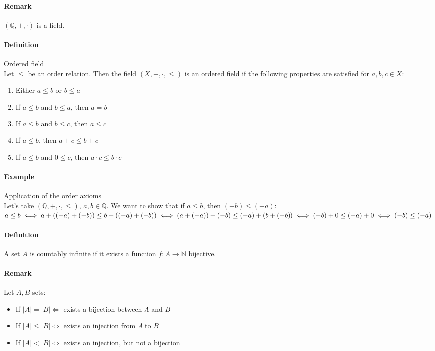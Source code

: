 \documentclass{article}
\newcommand{\functoN}[2]{#1 : #2 \rightarrow \mathbb{N}}
\newcommand{\Q}{\mathbb{Q}}
\newcommand{\Def}{\paragraph{Definition}}
\newcommand{\Remark}{\paragraph{Remark}}
\newcommand{\Example}{\paragraph{Example}}
\begin{document}
	\Remark $(\Q, +, \cdot)$ is a field.

	\Def Ordered field
\\Let $\leq$ be an order relation. Then the field $(X, +, \cdot, \leq)$ is an
	ordered field if the following properties are satisfied for $a, b, c\in X$:
	\begin{enumerate}[label=(\roman*)]
		\item Either $a \leq b$ or $b \leq a$

		\item If $a \leq b$ and $b \leq a$, then $a = b$

		\item If $a \leq b$ and $b \leq c$, then $a \leq c$

		\item If $a \leq b$, then $a + c \leq b + c$

		\item If $a \leq b$ and $0 \leq c$, then $a \cdot c \leq b \cdot c$
	\end{enumerate}

	\Example Application of the order axioms
\\Let's take $(\Q, +, \cdot, \leq)$, $a, b \in \Q$. We want to show that if $a
	\leq b$, then $(-b) \leq (-a)$:
\\$a \leq b \iff a + ((-a) + (-b)) \leq b + ((-a) + (-b)) \iff (a + (-a)) + (-b)
	 \leq (-a) + (b + (-b))
\\\iff (-b) + 0 \leq (-a) + 0 \iff (-b) \leq (-a)$

	\Def A set $A$ is countably infinite if it exists a function
	$\functoN{f}{A}$ bijective.

	\Remark Let $A, B$ sets:
	\begin{itemize}
		\item If $|A| = |B| \iff$ exists a bijection between $A$ and $B$

		\item If $|A| \leq |B| \iff$ exists an injection from $A$ to $B$

		\item If $|A| < |B| \iff$ exists an injection, but not a bijection
	\end{itemize}
\end{document}
